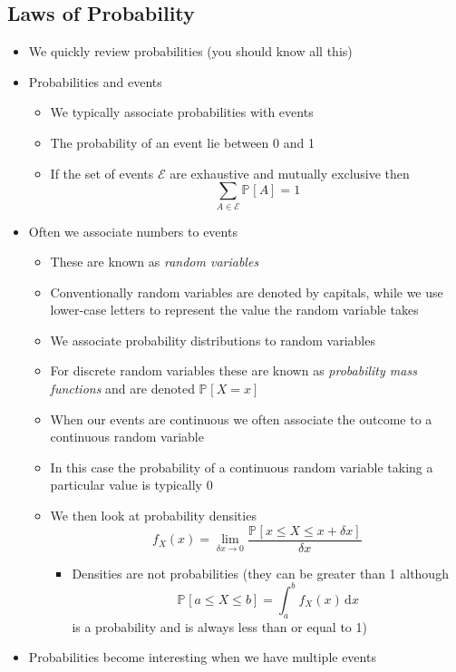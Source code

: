 \documentclass[11pt]{article}
\newcommand{\Prob}[2][]{\mathbb{P}_{#1\!}\left[ #2 \right]}
\newcommand{\dd}{\mathrm{d}}
\begin{document}
\subsection{Laws of Probability}
\label{sec:org03eb10c}
\begin{itemize}
\item We  quickly review probabilities (you should know all this)
\item Probabilities and events
\begin{itemize}
\item We typically associate probabilities with events
\item The probability of an event lie between 0 and 1
\item If the set of events \(\mathcal{E}\) are exhaustive and
mutually exclusive then
$$ \sum_{A\in\mathcal{E}} \Prob{A} = 1 $$
\end{itemize}
\item Often we associate numbers to events
\begin{itemize}
\item These are known as \emph{random variables}
\item Conventionally random variables are denoted by capitals,
while we use lower-case letters to represent the value the
random variable takes
\item We associate probability distributions to random variables
\item For discrete random variables these are known as
\emph{probability mass functions} and are denoted \(\Prob{X=x}\)
\item When our events are continuous we often associate the outcome
to a continuous random variable
\item In this case the probability of a continuous random variable
taking a particular value is typically 0
\item We then look at probability densities
$$ f_X(x) = \lim_{\delta x \rightarrow 0} \frac{\Prob{x\leq X \leq
        x+\delta x}}{\delta x} $$
\begin{itemize}
\item Densities are not probabilities (they can be greater than 1
although
$$ \Prob{a\leq X \leq b} = \int_a^b f_X(x)\,\dd x $$
is a probability and is always less than or equal to 1)
\end{itemize}
\end{itemize}
\item Probabilities become interesting when we have multiple events
\begin{itemize}

\end{itemize}
\end{itemize}
\end{document}
